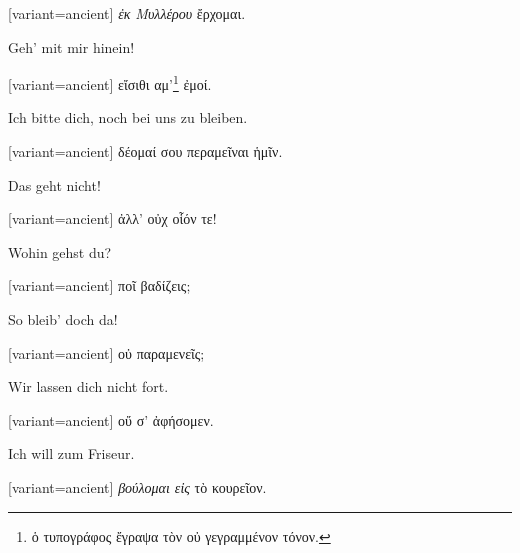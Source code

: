 \begin{greek}[variant=ancient]%
\emph{ἐκ Μυλλέρου} ἔρχομαι.

\end{greek}%
\switchcolumn*

Geh' mit mir hinein!

\switchcolumn

\begin{greek}[variant=ancient]%
εἴσιθι αμ'\footnote{ὁ τυπογράφος ἔγραψα τὸν οὐ γεγραμμένον τόνον.}
ἐμοί.

\end{greek}%
\switchcolumn*

Ich bitte dich, noch bei uns zu bleiben.

\switchcolumn

\begin{greek}[variant=ancient]%
δέομαί σου περαμεῖναι ἡμῖν.

\end{greek}%
\switchcolumn*

Das geht nicht!

\switchcolumn

\begin{greek}[variant=ancient]%
ἀλλ' οὐχ οἷόν τε!

\end{greek}%
\switchcolumn*

Wohin gehst du?

\switchcolumn

\begin{greek}[variant=ancient]%
ποῖ βαδίζεις;

\end{greek}%
\switchcolumn*

So bleib' doch da!

\switchcolumn

\begin{greek}[variant=ancient]%
οὐ παραμενεῖς;

\end{greek}%
\switchcolumn*

Wir lassen dich nicht fort.

\switchcolumn

\begin{greek}[variant=ancient]%
οὔ σ' ἀφήσομεν.

\end{greek}%
\switchcolumn*

Ich will zum Friseur.

\switchcolumn

\begin{greek}[variant=ancient]%
\emph{βούλομαι εἰς} τὸ κουρεῖον.

\end{greek}%
\switchcolumn*

